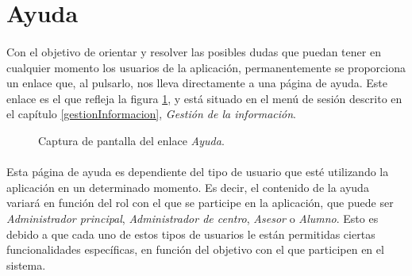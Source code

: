 \section{Ayuda}

  \paragraph{}Con el objetivo de orientar y resolver las posibles dudas que
  puedan tener en cualquier momento los usuarios de la aplicación,
  permanentemente se proporciona un enlace que, al pulsarlo, nos lleva
  directamente a una página de ayuda. Este enlace es el que refleja la figura
  \ref{capturaEnlaceAyuda}, y está situado en el menú de sesión descrito en el
  capítulo \ref{gestionInformacion}, \textit{Gestión de la información}.

  \begin{figure}[!ht]
    \begin{center}
      \caption{Captura de pantalla del enlace \textit{Ayuda}.}
      \label{capturaEnlaceAyuda}
    \end{center}
  \end{figure}

  \paragraph{}Esta página de ayuda es dependiente del tipo de usuario que esté
  utilizando la aplicación en un determinado momento. Es decir, el contenido de
  la ayuda variará en función del rol con el que se participe en la aplicación,
  que puede ser \textit{Administrador principal},
  \textit{Administrador de centro}, \textit{Asesor} o \textit{Alumno}. Esto es
  debido a que cada uno de estos tipos de usuarios le están permitidas ciertas
  funcionalidades específicas, en función del objetivo con el que participen en
  el sistema.
